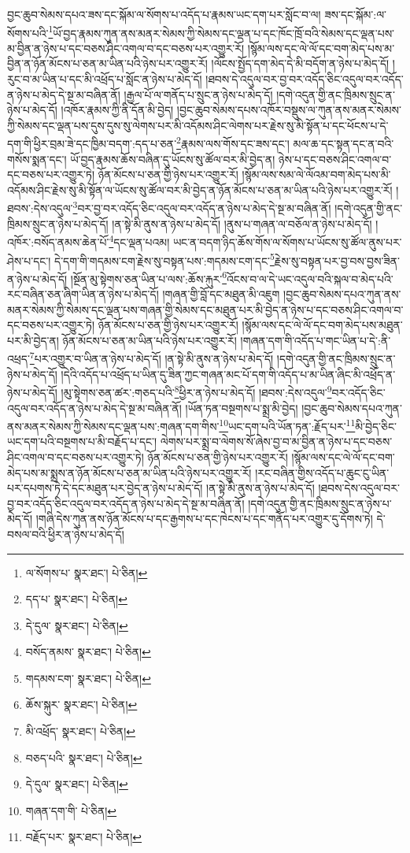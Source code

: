 བྱང་ཆུབ་སེམས་དཔའ་ཟས་དང་སྐོམ་ལ་སོགས་པ་འདོད་པ་རྣམས་ཡང་དག་པར་སློང་བ་ལ། ཟས་དང་སྐོམ་:ལ་སོགས་པའི་\footnote{ལ་སོགས་པ་  སྣར་ཐང་།  པེ་ཅིན། }ཡོ་བྱད་རྣམས་ཀུན་ནས་མནར་སེམས་ཀྱི་སེམས་དང་ལྡན་པ་དང་ཁོང་ཁྲོ་བའི་སེམས་དང་ལྡན་པས་མ་བྱིན་ན་ཉེས་པ་དང་བཅས་ཤིང་འགལ་བ་དང་བཅས་པར་འགྱུར་རོ། །སྙོམ་ལས་དང་ལེ་ལོ་དང་བག་མེད་པས་མ་བྱིན་ན་ཉོན་མོངས་པ་ཅན་མ་ཡིན་པའི་ཉེས་པར་འགྱུར་རོ། །ལོངས་སྤྱོད་དག་མེད་དེ་མི་བདོག་ན་ཉེས་པ་མེད་དོ། །རུང་བ་མ་ཡིན་པ་དང་མི་འཕྲོད་པ་སློང་ན་ཉེས་པ་མེད་དོ། །ཐབས་དེ་འདུལ་བར་བྱ་བར་འདོད་ཅིང་འདུལ་བར་འདོད་ན་ཉེས་པ་མེད་དེ་སྔ་མ་བཞིན་ནོ། །རྒྱལ་པོ་ལ་གནོད་པ་སྲུང་ན་ཉེས་པ་མེད་དོ། །དགེ་འདུན་གྱི་ནང་ཁྲིམས་སྲུང་ན་ཉེས་པ་མེད་དོ། །འཁོར་རྣམས་ཀྱི་ནི་དོན་མི་བྱེད། །བྱང་ཆུབ་སེམས་དཔས་འཁོར་བསྡུས་ལ་ཀུན་ནས་མནར་སེམས་ཀྱི་སེམས་དང་ལྡན་པས་དུས་དུས་སུ་ལེགས་པར་མི་འདོམས་ཤིང་ལེགས་པར་རྗེས་སུ་མི་སྟོན་པ་དང་ཕོངས་པ་དེ་དག་གི་ཕྱིར་བྲམ་ཟེ་དང་ཁྱིམ་བདག་:དད་པ་ཅན་\footnote{དད་པ་  སྣར་ཐང་།  པེ་ཅིན། }རྣམས་ལས་གོས་དང་ཟས་དང་། མལ་ཆ་དང་སྟན་དང་ན་བའི་གསོས་སྨན་དང་། ཡོ་བྱད་རྣམས་ཆོས་བཞིན་དུ་ཡོངས་སུ་ཚོལ་བར་མི་བྱེད་ན། ཉེས་པ་དང་བཅས་ཤིང་འགལ་བ་དང་བཅས་པར་འགྱུར་ཏེ། ཉོན་མོངས་པ་ཅན་གྱི་ཉེས་པར་འགྱུར་རོ། །སྙོམ་ལས་སམ་ལེ་ལོའམ་བག་མེད་པས་མི་འདོམས་ཤིང་རྗེས་སུ་མི་སྟོན་ལ་ཡོངས་སུ་ཚོལ་བར་མི་བྱེད་ན་ཉོན་མོངས་པ་ཅན་མ་ཡིན་པའི་ཉེས་པར་འགྱུར་རོ། །ཐབས་:དེས་འདུལ་\footnote{དེ་དུལ་  སྣར་ཐང་།  པེ་ཅིན། }བར་བྱ་བར་འདོད་ཅིང་འདུལ་བར་འདོད་ན་ཉེས་པ་མེད་དེ་སྔ་མ་བཞིན་ནོ། །དགེ་འདུན་གྱི་ནང་ཁྲིམས་སྲུང་ན་ཉེས་པ་མེད་དོ། །ན་སྟེ་མི་ནུས་ན་ཉེས་པ་མེད་དོ། །ནུས་པ་གཞན་ལ་བཅོལ་ན་ཉེས་པ་མེད་དོ། །འཁོར་:བསོད་ནམས་ཆེན་པོ་\footnote{བསོད་ནམས་  སྣར་ཐང་།  པེ་ཅིན། }དང་ལྡན་པའམ། ཡང་ན་བདག་ཉིད་ཆོས་གོས་ལ་སོགས་པ་ཡོངས་སུ་ཚོལ་ནུས་པར་ཤེས་པ་དང་། དེ་དག་གི་གདམས་ངག་རྗེས་སུ་བསྟན་པས་:གདམས་ངག་དང་\footnote{གདམས་ངག་  སྣར་ཐང་།  པེ་ཅིན། }རྗེས་སུ་བསྟན་པར་བྱ་བས་བྱས་ཟིན་ན་ཉེས་པ་མེད་དོ། །སྔོན་མུ་སྟེགས་ཅན་ཡིན་པ་ལས་:ཆོས་རྐུར་\footnote{ཆོས་སྐུར་  སྣར་ཐང་།  པེ་ཅིན། }འོངས་བ་ལ་དེ་ཡང་འདུལ་བའི་སྐལ་བ་མེད་པའི་རང་བཞིན་ཅན་ཞིག་ཡིན་ན་ཉེས་པ་མེད་དོ། །གཞན་གྱི་བློ་དང་མཐུན་མི་འཇུག །བྱང་ཆུབ་སེམས་དཔའ་ཀུན་ནས་མནར་སེམས་ཀྱི་སེམས་དང་ལྡན་པས་གཞན་གྱི་སེམས་དང་མཐུན་པར་མི་བྱེད་ན་ཉེས་པ་དང་བཅས་ཤིང་འགལ་བ་དང་བཅས་པར་འགྱུར་ཏེ། ཉོན་མོངས་པ་ཅན་གྱི་ཉེས་པར་འགྱུར་རོ། །སྙོམ་ལས་དང་ལེ་ལོ་དང་བག་མེད་པས་མཐུན་པར་མི་བྱེད་ན། ཉོན་མོངས་པ་ཅན་མ་ཡིན་པའི་ཉེས་པར་འགྱུར་རོ། །གཞན་དག་གི་འདོད་པ་གང་ཡིན་པ་དེ་:ནི་འཕྲད་\footnote{མི་འཕྲོད་  སྣར་ཐང་།  པེ་ཅིན། }པར་འགྱུར་བ་ཡིན་ན་ཉེས་པ་མེད་དོ། །ན་སྟེ་མི་ནུས་ན་ཉེས་པ་མེད་དོ། །དགེ་འདུན་གྱི་ནང་ཁྲིམས་སྲུང་ན་ཉེས་པ་མེད་དོ། །དེའི་འདོད་པ་འཕྲོད་པ་ཡིན་དུ་ཟིན་ཀྱང་གཞན་མང་པོ་དག་གི་འདོད་པ་མ་ཡིན་ཞིང་མི་འཕྲོད་ན་ཉེས་པ་མེད་དོ། །མུ་སྟེགས་ཅན་ཚར་:གཅད་པའི་\footnote{བཅད་པའི་  སྣར་ཐང་།  པེ་ཅིན། }ཕྱིར་ན་ཉེས་པ་མེད་དོ། །ཐབས་:དེས་འདུལ་\footnote{དེ་དུལ་  སྣར་ཐང་།  པེ་ཅིན། }བར་འདོད་ཅིང་འདུལ་བར་འདོད་ན་ཉེས་པ་མེད་དེ་སྔ་མ་བཞིན་ནོ། །ཡོན་ཏན་བསྔགས་པ་སྨྲ་མི་བྱེད། །བྱང་ཆུབ་སེམས་དཔའ་ཀུན་ནས་མནར་སེམས་ཀྱི་སེམས་དང་ལྡན་པས་:གཞན་དག་གིས་\footnote{གཞན་དག་གི་  པེ་ཅིན། }ཡང་དག་པའི་ཡོན་ཏན་:རྗོད་པར་\footnote{བརྗོད་པར་  སྣར་ཐང་།  པེ་ཅིན། }མི་བྱེད་ཅིང་ཡང་དག་པའི་བསྔགས་པ་མི་བརྗོད་པ་དང་། ལེགས་པར་སྨྲ་བ་ལེགས་སོ་ཞེས་བྱ་བ་མ་བྱིན་ན་ཉེས་པ་དང་བཅས་ཤིང་འགལ་བ་དང་བཅས་པར་འགྱུར་ཏེ། ཉོན་མོངས་པ་ཅན་གྱི་ཉེས་པར་འགྱུར་རོ། །སྙོམ་ལས་དང་ལེ་ལོ་དང་བག་མེད་པས་མ་སྨྲས་ན་ཉོན་མོངས་པ་ཅན་མ་ཡིན་པའི་ཉེས་པར་འགྱུར་རོ། །རང་བཞིན་གྱིས་འདོད་པ་ཆུང་ངུ་ཡིན་པར་དཔགས་ཏེ་དེ་དང་མཐུན་པར་བྱེད་ན་ཉེས་པ་མེད་དོ། །ན་སྟེ་མི་ནུས་ན་ཉེས་པ་མེད་དོ། །ཐབས་དེས་འདུལ་བར་བྱ་བར་འདོད་ཅིང་འདུལ་བར་འདོད་ན་ཉེས་པ་མེད་དེ་སྔ་མ་བཞིན་ནོ། །དགེ་འདུན་གྱི་ནང་ཁྲིམས་སྲུང་ན་ཉེས་པ་མེད་དོ། །གཞི་དེས་ཀུན་ནས་ཉོན་མོངས་པ་དང་རྒྱགས་པ་དང་ཁེངས་པ་དང་གནོད་པར་འགྱུར་དུ་དོགས་ཏེ། དེ་བསལ་བའི་ཕྱིར་ན་ཉེས་པ་མེད་དོ། 